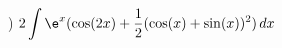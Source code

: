 \documentclass{article}
\begin{document}
) ${\displaystyle 2\int \e^{x}(\cos(2x)+\frac{1}{2}(\cos(x)+\sin(x))^{2}) \,dx}$ \newline

\pagebreak
\end{document}
